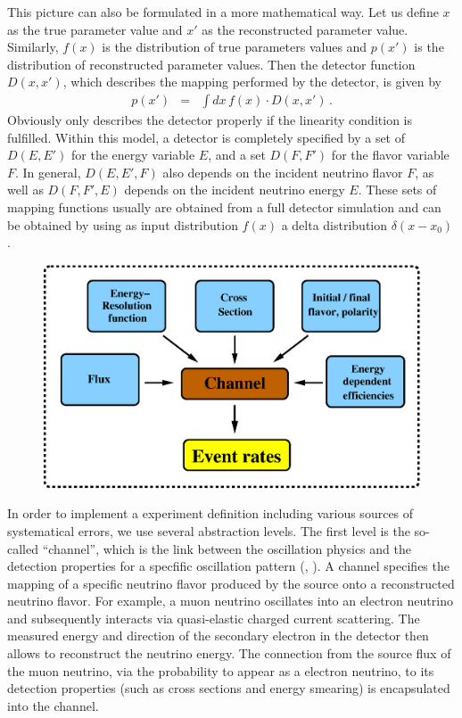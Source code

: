 This picture can also be formulated in a more mathematical way. Let us define $x$ as the true parameter value and $x'$ as the reconstructed parameter value. Similarly, $f(x)$ is the distribution of true parameters values and $p(x')$ is the distribution of reconstructed parameter values. Then the detector function  $D(x,x')$, which describes the mapping performed by the detector, is given by
\begin{eqnarray}
\label{equ:mapping}
p(x')&=&\int dx\, f(x)\cdot D(x,x')\,.
\end{eqnarray}
Obviously  only describes the detector properly
if the linearity condition is fulfilled. Within this model, a detector
is completely specified by a set of $D(E,E')$ for the energy variable $E$,
and a set $D(F,F')$ for the flavor variable $F$. In general, $D(E,E',F)$ also depends on the incident neutrino flavor $F$, as well as $D(F,F',E)$ depends on the incident neutrino energy $E$. These sets of mapping functions usually are obtained from a 
full detector simulation and can be obtained by using as input 
distribution $f(x)$ a delta distribution $\delta(x-x_0)$.

\begin{figure}[t]
\begin{center}
\includegraphics[width=13cm]{AEDL1}
\end{center}
\end{figure}

In order to implement a experiment definition including various
sources of systematical errors, we use several abstraction levels. 
The first level is the so-called ``channel'', 
 which is the link between 
the oscillation physics and the detection properties for a specfific oscillation pattern (\cf, ). A channel specifies the mapping of a specific neutrino flavor produced by the source onto a reconstructed neutrino flavor.
For example, a muon neutrino oscillates into an electron neutrino and subsequently interacts via quasi-elastic charged current scattering. The measured energy and direction of
the secondary electron in the detector then allows to reconstruct the neutrino energy. The connection from the source flux of the muon neutrino, via the  probability to appear as a electron neutrino, to its detection properties (such as cross sections and energy smearing) is encapsulated into the channel.

